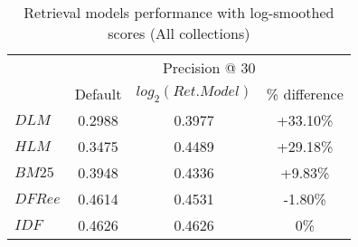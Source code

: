 \begin{table}[]
	
	\caption{Retrieval models performance with log-smoothed scores (All collections)} 
	\centering
	\begin{tabular}{l|c|c|c|} 
		
		\multicolumn{1}{c}{}&\multicolumn{3}{|c|}{Precision @ 30} \\ 
		\cline{2- 4}
		
			& Default & $log_2(Ret. Model)$ & \% difference \\
		\hline
					 
		$DLM$ & 0.2988 & 0.3977 & +33.10\% \\
		$HLM$ & 0.3475 & 0.4489 & +29.18\%\\
		$BM25$ & 0.3948 & 0.4336 & +9.83\%\\
		$DFRee$ & 0.4614 & 0.4531 & -1.80\%\\
		$IDF$ & 0.4626 & 0.4626 & 0\%\\
		\hline
	\end{tabular}
	\label{loggedRMS}
\end{table}
